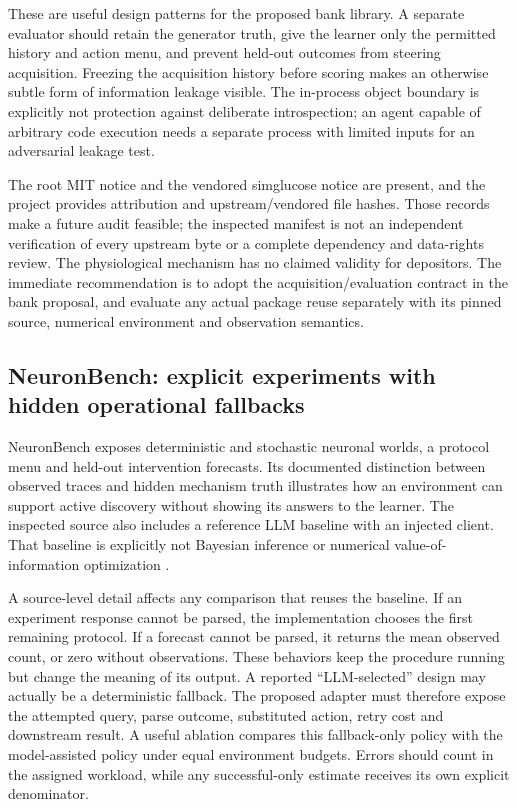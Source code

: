 These are useful design patterns for the proposed bank library. A separate
evaluator should retain the generator truth, give the learner only the
permitted history and action menu, and prevent held-out outcomes from steering
acquisition. Freezing the acquisition history before scoring makes an
otherwise subtle form of information leakage visible. The in-process object
boundary is explicitly not protection against deliberate introspection;
an agent capable of arbitrary code execution needs a separate process with
limited inputs for an adversarial leakage test.

The root MIT notice and the vendored simglucose notice are present, and the
project provides attribution and upstream/vendored file hashes. Those records
make a future audit feasible; the inspected manifest is not an independent
verification of every upstream byte or a complete dependency and data-rights
review. The physiological mechanism has no claimed validity for depositors.
The immediate recommendation is to adopt the acquisition/evaluation contract
in the bank proposal, and evaluate any actual package reuse separately with
its pinned source, numerical environment and observation semantics.

\subsection{NeuronBench: explicit experiments with hidden operational fallbacks}

NeuronBench exposes deterministic and stochastic neuronal worlds, a protocol
menu and held-out intervention forecasts. Its documented distinction between
observed traces and hidden mechanism truth illustrates how an environment can
support active discovery without showing its answers to the learner. The
inspected source also includes a reference LLM baseline with an injected
client. That baseline is explicitly not Bayesian inference or numerical
value-of-information optimization
\cite{exec13_active_neuronbench}.

A source-level detail affects any comparison that reuses the baseline.
If an experiment response cannot be parsed, the implementation chooses the
first remaining protocol. If a forecast cannot be parsed, it returns the mean
observed count, or zero without observations. These behaviors keep the
procedure running but change the meaning of its output. A reported
``LLM-selected'' design may actually be a deterministic fallback. The proposed
adapter must therefore expose the attempted query, parse outcome, substituted
action, retry cost and downstream result. A useful ablation compares this
fallback-only policy with the model-assisted policy under equal environment
budgets. Errors should count in the assigned workload, while any
successful-only estimate receives its own explicit denominator.

